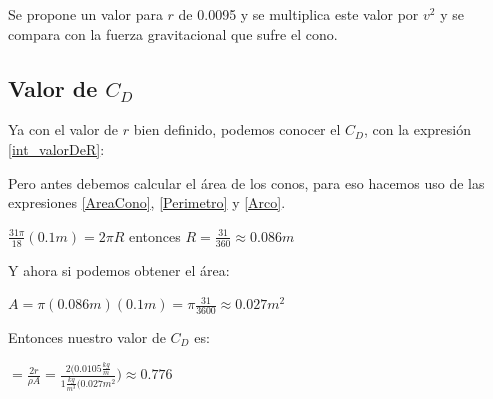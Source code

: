 Se propone un valor para $r$ de 0.0095 y se multiplica este
valor por $v^2$ y se compara con la fuerza gravitacional que
sufre el cono.
\subsection{Valor de $C_D$}

Ya con el valor de $r$ bien definido, podemos conocer el
$C_D$, con la expresión \ref{int_valorDeR}:

Pero antes debemos calcular el área de los conos, para eso
hacemos uso de las expresiones \ref{AreaCono}, \ref{Perimetro}
y \ref{Arco}.

$\frac{31 \pi}{18}(0.1 m) = 2\pi R$
entonces $R = \frac{31}{360} \approx 0.086 m$

Y ahora si podemos obtener el área:

$A = \pi (0.086 m) (0.1 m) = \pi \frac{31}{3600} \approx 0.027m^2$

Entonces nuestro valor de $C_D$ es:

$ = \frac{2r}{\rho A} = \frac{2(0.0105\frac{kg}{m}}{1\frac{kg}{m^3}(0.027 m^2}) \approx 0.776$
